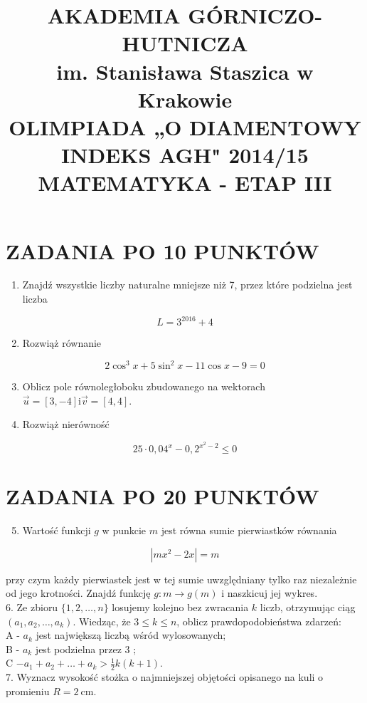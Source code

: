 \documentclass[10pt]{article}
\title{AKADEMIA GÓRNICZO-HUTNICZA \\
 im. Stanisława Staszica w Krakowie \\
 OLIMPIADA „O DIAMENTOWY INDEKS AGH" 2014/15 \\
 MATEMATYKA - ETAP III }
\author{}
\date{}
\begin{document}
\maketitle
\section*{ZADANIA PO 10 PUNKTÓW}
\begin{enumerate}
  \item Znajdź wszystkie liczby naturalne mniejsze niż 7, przez które podzielna jest liczba
\end{enumerate}

$$
L=3^{2016}+4
$$

\begin{enumerate}
  \setcounter{enumi}{1}
  \item Rozwiąż równanie
\end{enumerate}

$$
2 \cos ^{3} x+5 \sin ^{2} x-11 \cos x-9=0
$$

\begin{enumerate}
  \setcounter{enumi}{2}
  \item Oblicz pole równoległoboku zbudowanego na wektorach $\vec{u}=[3,-4] \mathrm{i} \vec{v}=[4,4]$.
  \item Rozwiąż nierówność
\end{enumerate}

$$
25 \cdot 0,04^{x}-0,2^{x^{2}-2} \leq 0
$$

\section*{ZADANIA PO 20 PUNKTÓW}
\begin{enumerate}
  \setcounter{enumi}{4}
  \item Wartość funkcji $g$ w punkcie $m$ jest równa sumie pierwiastków równania
\end{enumerate}

$$
\left|m x^{2}-2 x\right|=m
$$

przy czym każdy pierwiastek jest w tej sumie uwzględniany tylko raz niezależnie od jego krotności. Znajdź funkcję $g: m \rightarrow g(m)$ i naszkicuj jej wykres.\\
6. Ze zbioru $\{1,2, \ldots, n\}$ losujemy kolejno bez zwracania $k$ liczb, otrzymując ciąg $\left(a_{1}, a_{2}, \ldots, a_{k}\right)$. Wiedząc, że $3 \leq k \leq n$, oblicz prawdopodobieństwa zdarzeń:\\
A - $a_{k}$ jest największą liczbą wśród wylosowanych;\\
B - $a_{k}$ jest podzielna przez 3 ;\\
C $-a_{1}+a_{2}+\ldots+a_{k}>\frac{1}{2} k(k+1)$.\\
7. Wyznacz wysokość stożka o najmniejszej objętości opisanego na kuli o promieniu $R=2 \mathrm{~cm}$.
\end{document}
